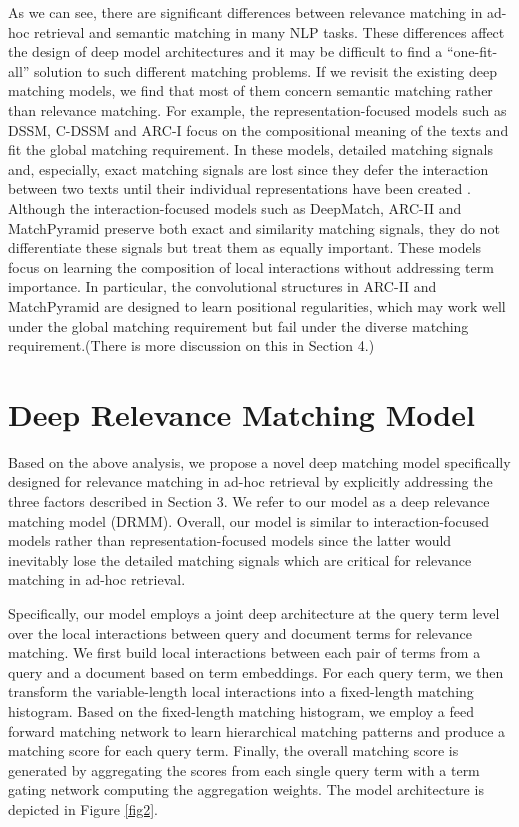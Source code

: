 \documentclass{sig-alternate-05-2015}
\begin{document}
As we can see, there are significant differences between relevance matching in ad-hoc retrieval and semantic matching in many NLP tasks. These differences affect the design of deep model architectures and it may be difficult to find a ``one-fit-all'' solution to such different matching problems. If we revisit the existing deep matching models, we find that most of them concern semantic matching rather than relevance matching. For example, the representation-focused models such as DSSM, C-DSSM and ARC-I focus on the compositional meaning of the texts and fit the global matching requirement. In these models, detailed matching signals and, especially, exact matching signals are lost since they defer the interaction between two texts until their individual representations have been created \cite{hu2014convolutional}. Although the interaction-focused models such as DeepMatch, ARC-II and MatchPyramid preserve both exact and similarity matching signals, they do not differentiate these signals but treat them as equally important. These models focus on learning the composition of local interactions without addressing term importance. In particular, the convolutional structures in ARC-II and MatchPyramid are designed to learn positional regularities, which may work well under the global matching requirement but fail under the diverse matching requirement.(There is more discussion on this in Section 4.)

\section{Deep Relevance Matching Model}
Based on the above analysis, we propose a novel deep matching model specifically designed for relevance matching in ad-hoc retrieval by explicitly addressing the three factors described in Section 3. We refer to our model as a deep relevance matching model (DRMM). Overall, our model is similar to interaction-focused models rather than representation-focused models since the latter would inevitably lose the detailed matching signals which are critical for relevance matching in ad-hoc retrieval.

Specifically, our model employs a joint deep architecture at the query term level over the local interactions between query and document terms for relevance matching. We first build local interactions between each pair of terms from a query and a document based on term embeddings. For each query term, we then transform the variable-length local interactions into a fixed-length matching histogram. Based on the fixed-length matching histogram, we employ a feed forward matching network to learn hierarchical matching patterns and produce a matching score for each query term. Finally, the overall matching score is generated by aggregating the scores from each single query term with a term gating network computing the aggregation weights. The model architecture is depicted in Figure \ref{fig2}.
\end{document}
